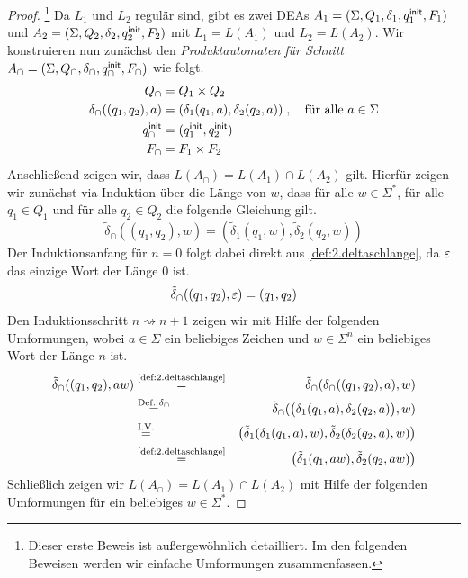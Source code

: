
\begin{proof}\footnote{Dieser erste Beweis ist außergewöhnlich detailliert. Im den folgenden Beweisen werden wir einfache Umformungen zusammenfassen.}
Da $L_1$ und $L_2$ regulär sind, gibt es zwei \ac{DEA}s $A_1=(\Sigma, Q_1,\delta_1,q^\mathsf{init}_1,F_1)$ und $A_2=(\Sigma, Q_2,\delta_2,q^\mathsf{init}_2,F_2)$ mit $L_1=L(A_1)$ und $L_2=L(A_2)$.
Wir konstruieren nun zunächst den \emph{Produktautomaten für Schnitt} $A_\cap=(\Sigma, Q_\cap,\delta_\cap,q^\mathsf{init}_\cap,F_\cap)$ wie folgt.
		\begin{align*}
			Q_\cap &= Q_1\times Q_2\\
			\delta_\cap((q_1,q_2),a) &= (\delta_1(q_1,a),\delta_2(q_2,a))\;, \quad \text{für alle } a\in\Sigma\\
			q^\mathsf{init}_\cap &= (q^\mathsf{init}_1,q^\mathsf{init}_2)\\
			F_\cap &= F_1\times F_2\\
		\end{align*}
Anschließend zeigen wir, dass $L(A_\cap)=L(A_1)\cap L(A_2)$ gilt. 
Hierfür zeigen wir zunächst via Induktion über die Länge von $w$, dass für alle $w\in\Sigma^*$, für alle $q_1\in Q_1$ und für alle $q_2\in Q_2$ die folgende Gleichung gilt.
$$\tilde{\delta}_\cap((q_1,q_2),w) = (\tilde{\delta}_1(q_1,w), \tilde{\delta}_2(q_2,w))$$
Der Induktionsanfang für $n=0$ folgt dabei direkt aus \autoref{def:2.deltaschlange}, da $\varepsilon$ das einzige Wort der Länge $0$ ist.
$$\tilde{\delta}_\cap((q_1,q_2),\varepsilon) = (q_1,q_2)$$
Den Induktionsschritt $n\rightsquigarrow n+1$ zeigen wir mit Hilfe der folgenden Umformungen, wobei $a\in\Sigma$ ein beliebiges Zeichen und $w\in\Sigma^n$ ein beliebiges Wort der Länge $n$ ist.
\begin{eqnarray*}
  \tilde{\delta}_\cap((q_1,q_2),aw) 
    & \stackrel{\text{\autoref{def:2.deltaschlange}}}{=} & \tilde{\delta}_\cap(\delta_\cap((q_1,q_2),a),w)\\
    & \stackrel{\text{Def.\ }\delta_\cap}{=} & \tilde{\delta}_\cap (\big(\delta_1(q_1,a),\delta_2(q_2,a)\big),w)\\
    & \stackrel{\text{I.V.}}{=} & \big(\tilde{\delta}_1 (\delta_1(q_1,a),w), \tilde{\delta}_2(\delta_2(q_2,a),w)\big)\\
    & \stackrel{\text{\autoref{def:2.deltaschlange}}}{=} & \big(\tilde{\delta}_1(q_1,aw), \tilde{\delta}_2(q_2,aw)\big)
\end{eqnarray*}
Schließlich zeigen wir $L(A_\cap)=L(A_1)\cap L(A_2)$ mit Hilfe der folgenden Umformungen für ein beliebiges $w\in\Sigma^*$.

\end{proof}
